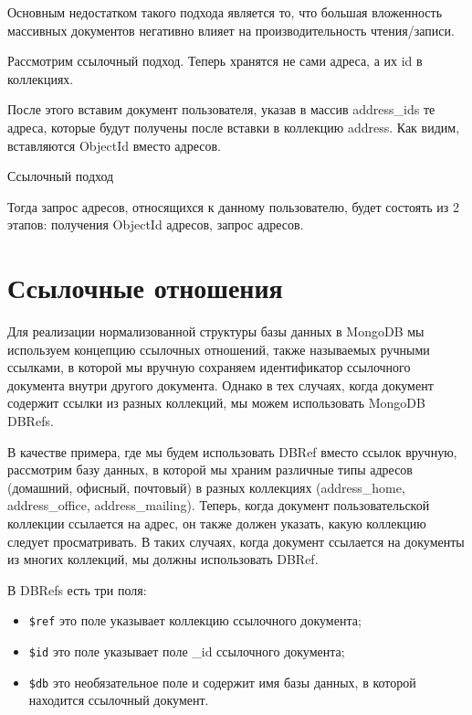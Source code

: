 Основным недостатком такого подхода является то, что большая
вложенность массивных документов негативно влияет на производительность
чтения/записи.\par
Рассмотрим ссылочный подход. Теперь хранятся не сами адреса, а их id в
коллекциях.\par
После этого вставим документ пользователя, указав в массив
address\_ids те адреса, которые будут получены после вставки в коллекцию
address. Как видим, вставляются ObjectId вместо адресов.

\begin{image}
	\caption{Ссылочный подход}
	\label{fig:links}
\end{image}

Тогда запрос адресов, относящихся к данному пользователю, будет
состоять из 2 этапов: получения ObjectId адресов, запрос адресов.

\section{Ссылочные отношения}

Для реализации нормализованной структуры базы данных в MongoDB мы
используем концепцию ссылочных отношений, также называемых ручными
ссылками, в которой мы вручную сохраняем идентификатор ссылочного
документа внутри другого документа. Однако в тех случаях, когда документ
содержит ссылки из разных коллекций, мы можем использовать MongoDB
DBRefs.\par
В качестве примера, где мы будем использовать DBRef вместо ссылок
вручную, рассмотрим базу данных, в которой мы храним различные типы
адресов (домашний, офисный, почтовый) в разных коллекциях (address\_home,
address\_office, address\_mailing). Теперь, когда документ пользовательской
коллекции ссылается на адрес, он также должен указать, какую коллекцию
следует просматривать. В таких случаях, когда документ ссылается на
документы из многих коллекций, мы должны использовать DBRef.

В DBRefs есть три поля:

\begin{itemize}
	\item \texttt{\$ref} это поле указывает коллекцию ссылочного документа;
	\item \texttt{\$id} это поле указывает поле \_id ссылочного документа;
	\item \texttt{\$db} это необязательное поле и содержит имя базы данных,
	в которой находится ссылочный документ.
\end{itemize}

